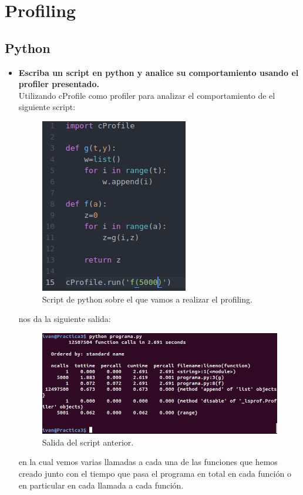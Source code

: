 \section{Profiling}
	\subsection{Python}
	\begin{itemize}
		\item \textbf{Escriba un script en python y analice su comportamiento usando el profiler presentado.}\\
		Utilizando cProfile\cite{python} como profiler para analizar el comportamiento de el siguiente script:\\
		\begin{figure}[H]
		\centering
		\includegraphics[width=0.4\linewidth]{pythonProgram}
		\caption[Script en python]{Script de python sobre el que vamos a realizar el profiling.}
		\label{fig:pythonProgram}
		\end{figure}
		
		nos da la siguiente salida:\\
		
		\begin{figure}[H]
		\centering
		\includegraphics[width=0.8\linewidth]{python_profiling}
		\caption[profiling python]{Salida del script anterior.}
		\label{fig:python_profiling}
		\end{figure}
		
		en la cual vemos varias llamadas a cada una de las funciones que hemos creado junto con el tiempo que pasa el programa en total en cada función o en particular en cada llamada a cada función.


	\end{itemize}

